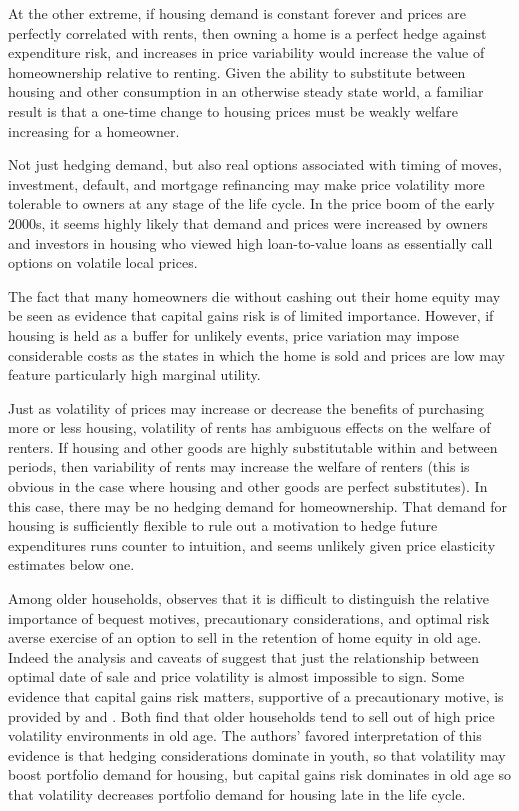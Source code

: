 \documentclass[12pt]{article}
\begin{document}
At the other extreme, if housing demand is constant forever and prices are
perfectly correlated with rents, then owning a home is a perfect hedge against
expenditure risk, and increases in price variability would increase the value of
homeownership relative to renting.  Given the ability to substitute between
housing and other consumption in an otherwise steady state world, a familiar
result is that a one-time change to housing prices must be weakly welfare
increasing for a homeowner.

Not just hedging demand, but also real options associated with timing of moves,
investment, default, and mortgage refinancing may make price volatility more
tolerable to owners at any stage of the life cycle.  In the price boom of the
early 2000s, it seems highly likely that demand and prices were increased by
owners and investors in housing who viewed high loan-to-value loans as
essentially call options on volatile local prices.

The fact that many homeowners die without cashing out their home equity may be
seen as evidence that capital gains risk is of limited importance.  However, if
housing is held as a buffer for unlikely events, price variation may impose
considerable costs as the states in which the home is sold and prices are low
may feature particularly high marginal utility.  

Just as volatility of prices may increase or decrease the benefits of purchasing
more or less housing, volatility of rents has ambiguous effects on the welfare
of renters.  If housing and other goods are highly substitutable within and
between periods, then variability of rents may increase the welfare of renters
(this is obvious in the case where housing and other goods are perfect
substitutes).  In this case, there may be no hedging demand for homeownership.
That demand for housing is sufficiently flexible to rule out a motivation to
hedge future expenditures runs counter to intuition, and seems unlikely given
price elasticity estimates below one.

Among older households, \textcite{Skinner} observes that it is difficult to
distinguish the relative importance of bequest motives, precautionary
considerations, and optimal risk averse exercise of an option to sell in the
retention of home equity in old age.  Indeed the analysis and caveats of
\textcite{EvansHendersonHobson} suggest that just the relationship between optimal
date of sale and price volatility is almost impossible to sign.  Some evidence
that capital gains risk matters, supportive of a precautionary motive, is
provided by \textcite{BanksBlundellOldfieldSmith} and \textcite{SinaiSouleles}.  Both
find that older households tend to sell out of high price volatility
environments in old age.  The authors' favored interpretation of this evidence
is that hedging considerations dominate in youth, so that volatility may boost
portfolio demand for housing, but capital gains risk dominates in old age so
that volatility decreases portfolio demand for housing late in the life cycle.
\end{document}
